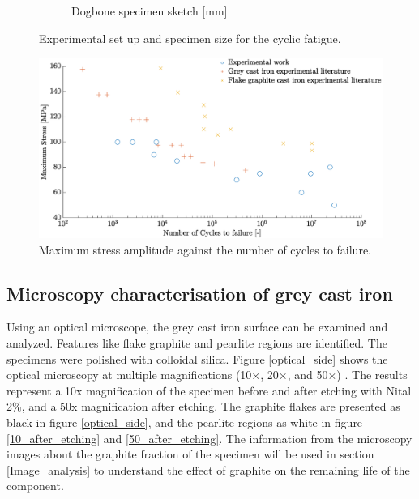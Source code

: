 \documentclass[11pt,a4paper]{article}
\begin{document}
\begin{figure} [ht]
\begin{subfigure}{0.5\textwidth}
\caption{Dogbone specimen sketch [mm]}
\label{dogbone}
\end{subfigure}
\caption{Experimental set up and specimen size for the cyclic fatigue.} 
\end{figure}

\begin{figure} [ht]
\centering
\includegraphics[width = 17cm]{S-N_curve.eps}
\caption{Maximum stress amplitude against the number of cycles to failure.}
\label{S_N}
\end{figure}

\subsection{Microscopy characterisation of grey cast iron}
Using an optical microscope, the grey cast iron surface can be examined and analyzed. Features like flake graphite and pearlite regions are identified. The specimens were polished with colloidal silica. Figure \ref{optical_side} shows the optical microscopy at multiple magnifications (10×, 20×, and 50×) \cite{de2020multi}. The results represent a 10x magnification of the specimen before and after etching with Nital 2\%, and a 50x magnification after etching. The graphite flakes are presented as black in figure \ref{optical_side}, and the pearlite regions as white in figure \ref{10_after_etching} and \ref{50_after_etching}. The information from the microscopy images about the graphite fraction of the specimen will be used in section \ref{Image_analysis} to understand the effect of graphite on the remaining life of the component.
\end{document}
